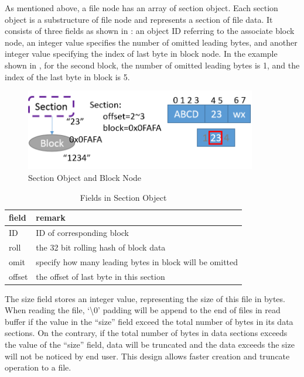     As mentioned above, a file node has an array of section object. Each section object is a substructure of file node and represents a section of file data. It consists of three fields as shown in : an object ID referring to the associate block node, an integer value specifies the number of omitted leading bytes, and another integer value specifying the index of last byte in block node. In the example shown in , for the second block, the number of omitted leading bytes is 1, and the index of the last byte in block is 5.

\begin{figure}[hbtp]
\centering
\includegraphics[width=0.9\textwidth]{Chapter-3/figs/fig9.png}
\caption{Section Object and Block Node}
\label{fig:section_and_block}
\end{figure}

\begin{table}
\caption{Fields in Section Object}
\label{tab:section_fields}
\begin{center}
\begin{tabular}{ll}
\toprule
field & remark\\
\midrule
ID & ID of corresponding block\\
roll & the 32 bit rolling hash of block data\\
omit & specify how many leading bytes in block will be omitted\\
offset & the offset of last byte in this section\\
\bottomrule
\end{tabular}
\end{center}
\end{table}

    The size field stores an integer value, representing the size of this file in bytes. When reading the file, `\textbackslash0' padding will be append to the end of files in read buffer if the value in the ``size'' field exceed the total number of bytes in its data sections. On the contrary, if the total number of bytes in data sections exceeds the value of the ``size'' field, data will be truncated and the data exceeds the size will not be noticed by end user. This design allows faster creation and truncate operation to a file.

